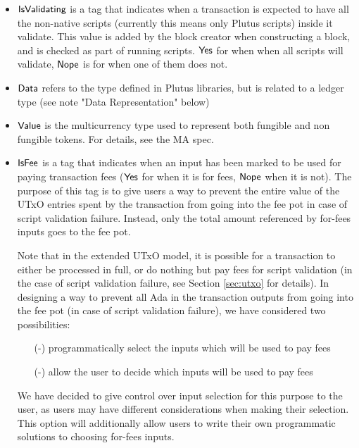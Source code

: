 \begin{itemize}
  \item $\mathsf{IsValidating}$ is a tag that indicates when a transaction is
  expected to have all the non-native scripts (currently this means only
  Plutus scripts) inside it validate.
  This value is added by the block creator when
  constructing a block, and is checked as part of running scripts.
  $\mathsf{Yes}$ for when when all scripts will validate,
  $\mathsf{Nope}$ is for when one of them does not.

  \item $\mathsf{Data}$ refers to the type defined in Plutus libraries, but is
  related to a ledger type (see note "Data Representation" below)

  \item $\mathsf{Value}$ is the multicurrency type used to represent
  both fungible and non fungible tokens. For details, see the MA spec.

  \item $\mathsf{IsFee}$ is a tag that indicates when an input has been marked
  to be used for paying transaction fees ($\mathsf{Yes}$ for when it is for fees,
  $\mathsf{Nope}$ when it is not). The purpose of this tag is to give users a way to prevent
  the entire value of the UTxO entries spent by the transaction
  from going into the fee pot in case of script validation failure.
  Instead, only the total amount referenced by for-fees inputs goes
  to the fee pot.

  Note that in the extended UTxO model, it is possible for a transaction
  to either be processed in full, or do nothing but pay fees for script
  validation (in the case of script validation failure, see Section
  \ref{sec:utxo} for details).
  In designing a way to prevent all Ada in the transaction outputs from going into
  the fee pot (in case of script validation failure), we have considered two
  possibilities:

  \begin{itemize}
    \item[(-)] programmatically select the inputs which will be used to pay fees
    \item[(-)] allow the user to decide which inputs will be used to pay fees
  \end{itemize}

  We have decided to give control over input selection for this purpose to the user,
  as users may have different considerations when making their selection. This
  option will additionally allow users to write their own programmatic solutions
  to choosing for-fees inputs.


\end{itemize}

